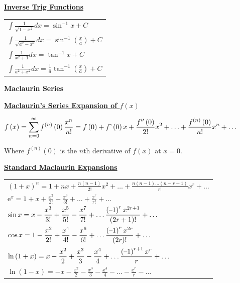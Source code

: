 \documentclass[11pt,a4paper]{book}
\begin{document}
\begin{sidewaysfigure}
\begin{minipage}[t]{0.23\textwidth}
\vspace{0.5cm}

\textbf{\large{}\uline{Inverse Trig Functions}}{\large\par}

\begin{tabular}{>{\raggedright}p{6cm}}
${\displaystyle \int\frac{1}{\sqrt{1-x^{2}}}dx=\sin^{-1}x}+C$\tabularnewline
${\displaystyle \int\frac{1}{\sqrt{a^{2}-x^{2}}}dx=\sin^{-1}\left(\frac{x}{a}\right)}+C$\tabularnewline
${\displaystyle \int\frac{1}{x^{2}+1}dx=\tan^{-1}x}+C$\tabularnewline
${\displaystyle \int\frac{1}{a^{2}+x^{2}}dx=\frac{1}{a}\tan^{-1}\left(\frac{x}{a}\right)}+C$\tabularnewline
\end{tabular}

\end{minipage}
\begin{minipage}[t]{0.4\textwidth}

\begin{center}
\textbf{\Large{}Maclaurin Series}{\Large\par}
\par\end{center}
\textbf{\large{}\uline{Maclaurin's Series Expansion of $f\left(x\right)$
}}{\large\par}
${\displaystyle f\left(x\right)=\sum\limits _{n=0}^{\infty}f^{\left(n\right)}\left(0\right)\frac{x^{n}}{n!}=f\left(0\right)+f\text{\textquoteright}\left(0\right)x+\frac{f^{\prime\prime}\left(0\right)}{2!}x^{2}+\ldots+\frac{f^{\left(n\right)}\left(0\right)}{n!}x^{n}+\ldots}$

Where $f^{\left(n\right)}\left(0\right)$ is the $n$th derivative
of $f\left(x\right)$ at $x=0$.

\vspace{0.5cm}


\textbf{\large{}\uline{Standard Maclaurin Expansions
}}{\large\par}

\setlength{\extrarowheight}{0.33cm}
\begin{tabular}[b]{>{\raggedright}m{12cm}}
${\displaystyle \left(1+x\right)^{n}=1+nx+\frac{n\left(n-1\right)}{2!}x^{2}+\ldots+\frac{n\left(n-1\right)\ldots\left(n-r+1\right)}{{r!}}}x^{r}+\ldots$
\tabularnewline
${\displaystyle \mathrm{e}^{x}=1+x+\frac{{x^{2}}}{{2!}}+\frac{{x^{3}}}{{3!}}+\ldots+\frac{{x^{r}}}{{r!}}+\ldots}$\tabularnewline
${\displaystyle \sin x=x-\frac{x^{3}}{3!}+\frac{x^{5}}{5!}-\frac{x^{7}}{7!}+\ldots\frac{\left(\text{\textendash}1\right)^{r}x^{2r+1}}{\left(2r+1\right)!}+\ldots}$\tabularnewline
${\displaystyle \cos x=1-\frac{x^{2}}{2!}+\frac{x^{4}}{4!}-\frac{x^{6}}{6!}+\ldots\frac{\left(\text{\textendash}1\right)^{r}x^{2r}}{\left(2r\right)!}+\ldots}$\tabularnewline
${\displaystyle \ln\left(1+x\right)=x-\frac{x^{2}}{2}+\frac{x^{3}}{3}-\frac{x^{4}}{4}+\ldots\frac{\left(\text{\textendash}1\right)^{r+1}x^{r}}{r}+\ldots}$\tabularnewline
${\displaystyle \ln\left(1-x\right)=-x-\frac{x^{2}}{2}-\frac{x^{3}}{3}-\frac{x^{4}}{4}-\ldots-\frac{x^{r}}{r}}-\ldots$\tabularnewline
\end{tabular}


\end{minipage}
\end{sidewaysfigure}
\end{document}
